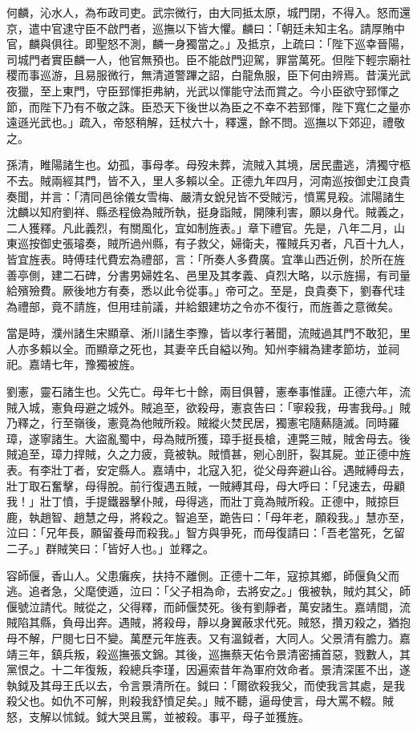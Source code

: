 \begin{pinyinscope}
何麟，沁水人，為布政司吏。武宗微行，由大同抵太原，城門閉，不得入。怒而還京，遣中官逮守臣不啟門者，巡撫以下皆大懼。麟曰：「朝廷未知主名。請厚賄中官，麟與俱往。即聖怒不測，麟一身獨當之。」及抵京，上疏曰：「陛下巡幸晉陽，司城門者實臣麟一人，他官無預也。臣不能啟門迎駕，罪當萬死。但陛下輕宗廟社稷而事巡游，且易服微行，無清道警蹕之詔，白龍魚服，臣下何由辨焉。昔漢光武夜獵，至上東門，守臣郅惲拒弗納，光武以惲能守法而賞之。今小臣欲守郅惲之節，而陛下乃有不敬之誅。臣恐天下後世以為臣之不幸不若郅惲，陛下寬仁之量亦遠遜光武也。」疏入，帝怒稍解，廷杖六十，釋還，餘不問。巡撫以下郊迎，禮敬之。

孫清，睢陽諸生也。幼孤，事母孝。母歿未葬，流賊入其境，居民盡逃，清獨守柩不去。賊兩經其門，皆不入，里人多賴以全。正德九年四月，河南巡按御史江良貴奏聞，并言：「清同邑徐儀女雪梅、嚴清女銳兒皆不受賊污，憤罵見殺。沭陽諸生沈麟以知府劉祥、縣丞程儉為賊所執，挺身詣賊，開陳利害，願以身代。賊義之，二人獲釋。凡此義烈，有關風化，宜如制旌表。」章下禮官。先是，八年二月，山東巡按御史張璿奏，賊所過州縣，有子救父，婦衛夫，罹賊兵刃者，凡百十九人，皆宜旌表。時傅珪代費宏為禮部，言：「所奏人多費廣。宜準山西近例，於所在旌善亭側，建二石碑，分書男婦姓名、邑里及其孝義、貞烈大略，以示旌揚，有司量給殯殮費。厥後地方有奏，悉以此令從事。」帝可之。至是，良貴奏下，劉春代珪為禮部，竟不請旌，但用珪前議，并給銀建坊之令亦不復行，而旌善之意微矣。

當是時，濮州諸生宋顯章、淅川諸生李豫，皆以孝行著聞，流賊過其門不敢犯，里人亦多賴以全。而顯章之死也，其妻辛氏自縊以殉。知州李緝為建孝節坊，並祠祀。嘉靖七年，豫獨被旌。

劉憲，靈石諸生也。父先亡。母年七十餘，兩目俱瞽，憲奉事惟謹。正德六年，流賊入城，憲負母避之城外。賊追至，欲殺母，憲哀告曰：「寧殺我，毋害我母。」賊乃釋之，行至嶺後，憲竟為他賊所殺。賊縱火焚民居，獨憲宅隨爇隨滅。同時羅璋，遂寧諸生。大盜亂蜀中，母為賊所獲，璋手挺長槍，連斃三賊，賊舍母去。後賊追至，璋力捍賊，久之力疲，竟被執。賊憤甚，剜心剖肝，裂其屍。並正德中旌表。有李壯丁者，安定縣人。嘉靖中，北寇入犯，從父母奔避山谷。遇賊縛母去，壯丁取石奮擊，母得脫。前行復遇五賊，一賊縛其母，母大呼曰：「兒速去，毋顧我！」壯丁憤，手提鐵器擊仆賊，母得逃，而壯丁竟為賊所殺。正德中，賊掠巨鹿，執趙智、趙慧之母，將殺之。智追至，跪告曰：「母年老，願殺我。」慧亦至，泣曰：「兄年長，願留養母而殺我。」智方與爭死，而母復請曰：「吾老當死，乞留二子。」群賊笑曰：「皆好人也。」並釋之。

容師偃，香山人。父患癱疾，扶持不離側。正德十二年，寇掠其鄉，師偃負父而逃。追者急，父麾使遁，泣曰：「父子相為命，去將安之。」俄被執，賊灼其父，師偃號泣請代。賊從之，父得釋，而師偃焚死。後有劉靜者，萬安諸生。嘉靖間，流賊陷其縣，負母出奔。遇賊，將殺母，靜以身翼蔽求代死。賊怒，攢刃殺之，猶抱母不解，尸閱七日不變。萬歷元年旌表。又有溫鉞者，大同人。父景清有膽力。嘉靖三年，鎮兵叛，殺巡撫張文錦。其後，巡撫蔡天佑令景清密捕首惡，戮數人，其黨恨之。十二年復叛，殺總兵李瑾，因遍索昔年為軍府效命者。景清深匿不出，遂執鉞及其母王氏以去，令言景清所在。鉞曰：「爾欲殺我父，而使我言其處，是我殺父也。如仇不可解，則殺我舒憤足矣。」賊不聽，逼母使言，母大罵不輟。賊怒，支解以怵鉞。鉞大哭且罵，並被殺。事平，母子並獲旌。


\end{pinyinscope}
